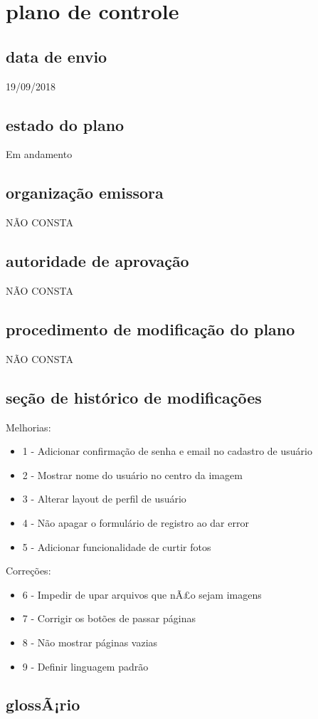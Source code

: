\chapter{plano de controle}

\section{data de envio}
19/09/2018
\section{estado do plano}
Em andamento
\section{organização emissora}
NÃO CONSTA
\section{autoridade de aprovação}
NÃO CONSTA
\section{procedimento de modificação do plano}
NÃO CONSTA
\section{seção de histórico de modificações}

Melhorias:

 \begin{itemize}
   \item 1 - Adicionar confirmação de senha e email no cadastro de usuário
   \item 2 - Mostrar nome do usuário no centro da imagem
   \item 3 - Alterar layout de perfil de usuário
   \item 4 - Não apagar o formulário de registro ao dar error
   \item 5 - Adicionar funcionalidade de curtir fotos
 \end{itemize}

Correções:

 \begin{itemize}
   \item 6 - Impedir de upar arquivos que nÃ£o sejam imagens
   \item 7 - Corrigir os botões de passar páginas
   \item 8 - Não mostrar páginas vazias
   \item 9 - Definir linguagem padrão
 \end{itemize}

\section{glossÃ¡rio}
